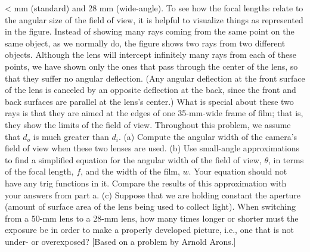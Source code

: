<%
mm (standard) and 28 mm (wide-angle). To see how the focal
lengths relate to the angular size of the field of view, it
is helpful to visualize things as represented in the figure.
Instead of showing many rays coming from the same point on
the same object, as we normally do, the figure shows two
rays from two different objects. Although the lens will
intercept infinitely many rays from each of these points, we
have shown only the ones that pass through the center of the
lens, so that they suffer no angular deflection. (Any
angular deflection at the front surface of the lens is
canceled by an opposite deflection at the back, since the
front and back surfaces are parallel at the lens's center.)
What is special about these two rays is that they are aimed
at the edges of one 35-mm-wide frame of film; that is, they
show the limits of the field of view. Throughout this
problem, we assume that $d_o$ is much greater than $d_i$.
(a) Compute the angular width of the camera's field of view
when these two lenses are used. (b) Use small-angle
approximations to find a simplified equation for the angular
width of the field of view, $\theta $, in terms of the focal
length, $f$, and the width of the film, $w$. Your equation
should not have any trig functions in it. Compare the
results of this approximation with your answers from part
a. (c) Suppose that we are holding constant the aperture
(amount of surface area of the lens being used to collect
light). When switching from a 50-mm lens to a 28-mm lens,
how many times longer or shorter must the exposure be in
order to make a properly developed picture, i.e., one that is
not under- or overexposed? [Based on a problem by Arnold Arons.]
